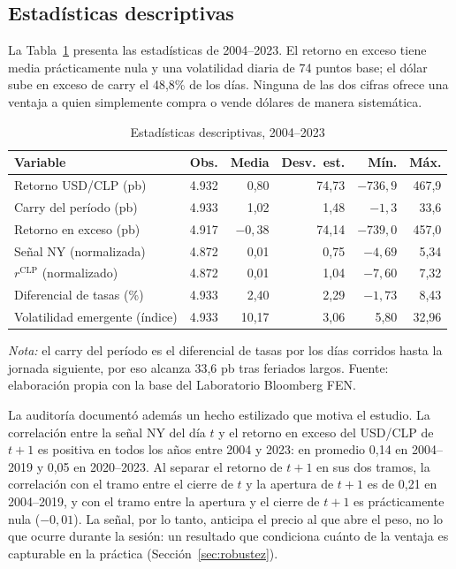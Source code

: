 \documentclass[11pt,a4paper]{article}
\begin{document}
\subsection{Estadísticas descriptivas}

La Tabla~\ref{tab:descriptivas} presenta las estadísticas de 2004--2023. El retorno en exceso tiene media prácticamente nula y una volatilidad diaria de 74 puntos base; el dólar sube en exceso de carry el 48,8\% de los días. Ninguna de las dos cifras ofrece una ventaja a quien simplemente compra o vende dólares de manera sistemática.

\begin{table}[htbp]\centering
\caption{Estadísticas descriptivas, 2004--2023}\label{tab:descriptivas}
\begin{threeparttable}
\begin{tabular}{l r r r r r}
\toprule
Variable & Obs. & Media & Desv.\ est. & Mín. & Máx. \\
\midrule
Retorno USD/CLP (pb) & 4.932 & 0,80 & 74,73 & $-736{,}9$ & 467,9 \\
Carry del período (pb) & 4.933 & 1,02 & 1,48 & $-1{,}3$ & 33,6 \\
Retorno en exceso (pb) & 4.917 & $-0{,}38$ & 74,14 & $-739{,}0$ & 457,0 \\
Señal NY (normalizada) & 4.872 & 0,01 & 0,75 & $-4{,}69$ & 5,34 \\
$r^{\text{CLP}}$ (normalizado) & 4.872 & 0,01 & 1,04 & $-7{,}60$ & 7,32 \\
Diferencial de tasas (\%) & 4.933 & 2,40 & 2,29 & $-1{,}73$ & 8,43 \\
Volatilidad emergente (índice) & 4.933 & 10,17 & 3,06 & 5,80 & 32,96 \\
\bottomrule
\end{tabular}
\begin{tablenotes}\footnotesize
\item \emph{Nota:} el carry del período es el diferencial de tasas por los días corridos hasta la jornada siguiente, por eso alcanza 33,6 pb tras feriados largos. Fuente: elaboración propia con la base del Laboratorio Bloomberg FEN.
\end{tablenotes}
\end{threeparttable}
\end{table}

La auditoría documentó además un hecho estilizado que motiva el estudio. La correlación entre la señal NY del día $t$ y el retorno en exceso del USD/CLP de $t+1$ es positiva en todos los años entre 2004 y 2023: en promedio 0,14 en 2004--2019 y 0,05 en 2020--2023. Al separar el retorno de $t+1$ en sus dos tramos, la correlación con el tramo entre el cierre de $t$ y la apertura de $t+1$ es de 0,21 en 2004--2019, y con el tramo entre la apertura y el cierre de $t+1$ es prácticamente nula ($-0{,}01$). La señal, por lo tanto, anticipa el precio al que abre el peso, no lo que ocurre durante la sesión: un resultado que condiciona cuánto de la ventaja es capturable en la práctica (Sección~\ref{sec:robustez}).
\end{document}
